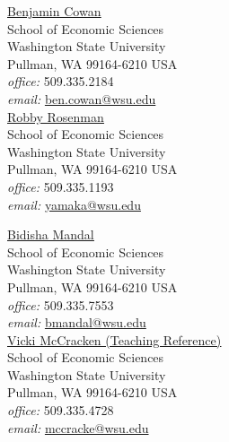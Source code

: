\begin{table}[ht] %
\begin{minipage}[t]{0.5\linewidth} %
\vspace{2em}
\href{http://people.ses.wsu.edu/Cowan/}{\underline{Benjamin Cowan}}\\
School of Economic Sciences\\
Washington State University\\
Pullman, WA 99164-6210 USA\\
\emph{office:} 509.335.2184\\
\emph{email:} \href{mailto:ben.cowan@wsu.edu}{ben.cowan@wsu.edu}\\

\href{http://people.ses.wsu.edu/Rosenman/}{\underline{Robby Rosenman}}\\
School of Economic Sciences\\
Washington State University\\
Pullman, WA 99164-6210 USA\\
\emph{office:} 509.335.1193\\
\emph{email:} \href{mailto:yamaka@wsu.edu}{yamaka@wsu.edu}
\end{minipage} %
\hspace{0.5cm} %
\begin{minipage}[t]{0.5\linewidth} %
\vspace{2em}
\href{http://people.ses.wsu.edu/Mandal/}{\underline{Bidisha Mandal}}\\
School of Economic Sciences\\
Washington State University\\
Pullman, WA 99164-6210 USA\\
\emph{office:} 509.335.7553\\
\emph{email:} \href{mailto:bmandal@wsu.edu}{bmandal@wsu.edu}\\

\href{http://people.ses.wsu.edu/McCracken/}{\underline{Vicki McCracken (Teaching Reference)}}\\
School of Economic Sciences\\
Washington State University\\
Pullman, WA 99164-6210 USA\\
\emph{office:} 509.335.4728\\
\emph{email:} \href{mailto:mccracke@wsu.edu}{mccracke@wsu.edu}\\


\end{minipage} %
\end{table}
